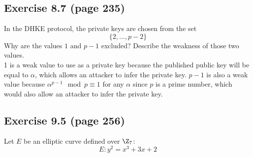 \documentclass{math}
\begin{document}
\subsection*{Exercise 8.7 (page 235)}
In the DHKE protocol, the private keys are chosen from the set
\[ \{2,\dots,p-2\} \]
Why are the values \( 1 \) and \( p-1 \) excluded? Describe the weakness of
those two values. \\
1 is a weak value to use as a private key because the published public key will
be equal to \( \alpha \), which allows an attacker to infer the private key.
\( p-1 \) is also a weak value because \( \alpha^{p-1}\mod p \equiv 1 \) for any
\( \alpha \) since \( p \) is a prime number, which would also allow an
attacker to infer the private key.

\subsection*{Exercise 9.5 (page 256)}
Let \( E \) be an elliptic curve defined over \( \Z_7 \):
\[ E: y^2 = x^3+3x+2 \]
\end{document}
